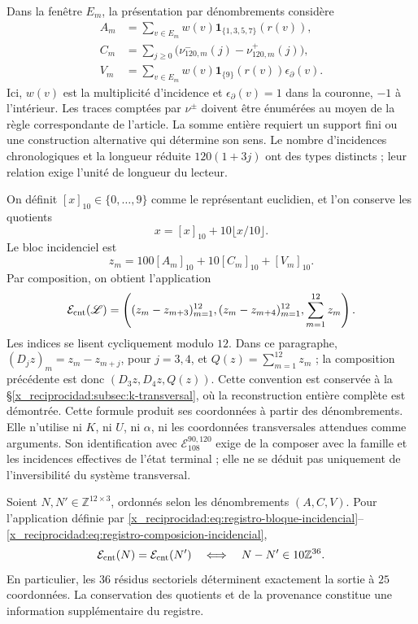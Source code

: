 Dans la fenêtre \(E_m\), la présentation par dénombrements considère
\begin{align}
 A_m&=\sum_{v\in E_m}w(v)
             \mathbf1_{\{1,3,5,7\}}(r(v)),\\
 C_m&=\sum_{j\geq0}\bigl(\nu^-_{120,m}(j)-\nu^+_{120,m}(j)\bigr),\\
 V_m&=\sum_{v\in E_m}w(v)\mathbf1_{\{9\}}(r(v))\epsilon_\partial(v).
\end{align}
Ici, \(w(v)\) est la multiplicité d'incidence et \(\epsilon_\partial(v)=1\) dans la couronne, \(-1\) à l'intérieur. Les traces comptées par \(\nu^\pm\) doivent être énumérées au moyen de la règle correspondante de l'article. La somme entière requiert un support fini ou une construction alternative qui détermine son sens. Le nombre d'incidences chronologiques et la longueur réduite \(120(1+3j)\) ont des types distincts ; leur relation exige l'unité de longueur du lecteur.

On définit \([x]_{10}\in\{0,\ldots,9\}\) comme le représentant
euclidien, et l'on conserve les quotients
\[
 x=[x]_{10}+10\lfloor x/10\rfloor.
\]
Le bloc incidenciel est
\begin{equation}
 z_m=100[A_m]_{10}+10[C_m]_{10}+[V_m]_{10}.
 \label{x_reciprocidad:eq:registro-bloque-incidencial}
\end{equation}
Par composition, on obtient l'application
\begin{equation}
 \mathcal E_{\rm cnt}(\mathscr L)=
 \left((z_m-z_{m+3})_{m=1}^{12},
       (z_m-z_{m+4})_{m=1}^{12},\sum_{m=1}^{12}z_m\right).
\label{x_reciprocidad:eq:registro-composicion-incidencial}
\end{equation}
Les indices se lisent cycliquement modulo \(12\). Dans ce paragraphe,
\((D_jz)_m=z_m-z_{m+j}\), pour \(j=3,4\), et
\(Q(z)=\sum_{m=1}^{12}z_m\) ; la composition précédente est donc
\((D_3z,D_4z,Q(z))\). Cette convention est conservée à la
\S\ref{x_reciprocidad:subsec:k-transversal}, où la reconstruction
entière complète est démontrée.
Cette formule produit ses coordonnées à partir des dénombrements. Elle n'utilise
ni \(K\), ni \(U\), ni \(\alpha\), ni les coordonnées transversales attendues
comme arguments. Son identification avec
\(\mathcal E_{108}^{90,120}\) exige de la composer avec la famille et
les incidences effectives de l'état terminal ; elle ne se déduit pas uniquement
de l'inversibilité du système transversal.

\begin{proposition}
\label{x_reciprocidad:prop:registro-36-residuos}
Soient \(N,N'\in\mathbb Z^{12\times3}\), ordonnés selon les dénombrements
\((A,C,V)\). Pour l'application définie par
\eqref{x_reciprocidad:eq:registro-bloque-incidencial}--\eqref{x_reciprocidad:eq:registro-composicion-incidencial},
\[
 \mathcal E_{\rm cnt}(N)=\mathcal E_{\rm cnt}(N')
 \quad\Longleftrightarrow\quad
 N-N'\in10\mathbb Z^{36}.
\]
En particulier, les \(36\) résidus sectoriels déterminent exactement
la sortie à \(25\) coordonnées. La conservation des quotients et
de la provenance constitue une information supplémentaire du registre.
\end{proposition}

